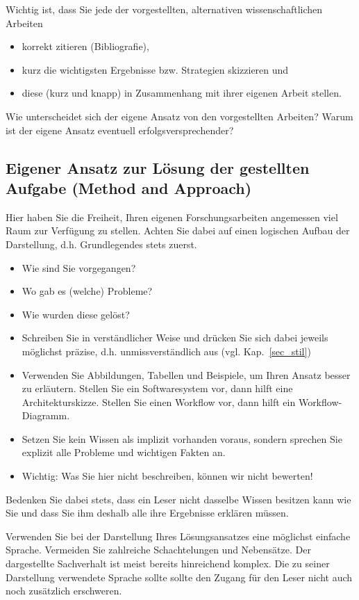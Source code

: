 \begin{itemize}
Wichtig ist, dass Sie jede der vorgestellten, alternativen wissenschaftlichen Arbeiten 
\begin{itemize}
\item korrekt zitieren (Bibliografie),
\item kurz die wichtigsten Ergebnisse bzw. Strategien skizzieren und
\item diese (kurz und knapp) in Zusammenhang mit ihrer eigenen Arbeit stellen. 
\end{itemize}
Wie unterscheidet sich der eigene Ansatz von den vorgestellten Arbeiten? 
Warum ist der eigene Ansatz eventuell erfolgsversprechender? 

\end{itemize}

\subsection{Eigener Ansatz zur Lösung der gestellten Aufgabe (Method and Approach)}
Hier haben Sie die Freiheit, Ihren eigenen Forschungsarbeiten angemessen viel Raum zur Verfügung zu stellen.
Achten Sie dabei auf einen logischen Aufbau der Darstellung, d.h. Grundlegendes stets zuerst.
\begin{itemize}
\item Wie sind Sie vorgegangen?
\item Wo gab es (welche) Probleme?
\item Wie wurden diese gelöst?
\item Schreiben Sie in verständlicher Weise und drücken Sie sich dabei jeweils möglichst präzise, d.h. unmissverständlich aus (vgl. Kap.~\ref{sec_stil})
\item Verwenden Sie Abbildungen, Tabellen und Beispiele, um Ihren Ansatz besser zu erläutern. Stellen Sie ein Softwaresystem vor, dann hilft eine Architekturskizze. Stellen Sie einen Workflow vor, dann hilft ein Workflow-Diagramm.
\item Setzen Sie kein Wissen als implizit vorhanden voraus, sondern sprechen Sie explizit alle Probleme und wichtigen Fakten an.
\item Wichtig: Was Sie hier nicht beschreiben, können wir nicht bewerten!
\end{itemize}
Bedenken Sie dabei stets, dass ein Leser nicht dasselbe Wissen besitzen kann wie Sie und dass Sie ihm deshalb alle ihre Ergebnisse erklären müssen.

\smallskip

Verwenden Sie bei der Darstellung Ihres Lösungsansatzes eine möglichst einfache Sprache.
Vermeiden Sie zahlreiche Schachtelungen und Nebensätze. Der dargestellte Sachverhalt ist meist bereits hinreichend komplex. 
Die zu seiner Darstellung verwendete Sprache sollte sollte den Zugang für den Leser nicht auch noch zusätzlich erschweren.



